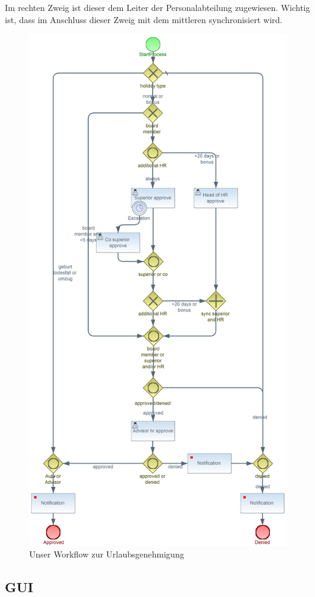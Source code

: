 Im rechten Zweig ist dieser dem Leiter der Personalabteilung zugewiesen. Wichtig ist, dass im Anschluss dieser Zweig mit dem mittleren synchronisiert wird.

\begin{figure}[H]
\centering
\includegraphics[width=0.75\linewidth]{Bilder/Urlaubsantrag}
\caption{Unser Workflow zur Urlaubsgenehmigung}
\label{fig:Urlaubsantrag}
\end{figure}




\subsection{GUI}